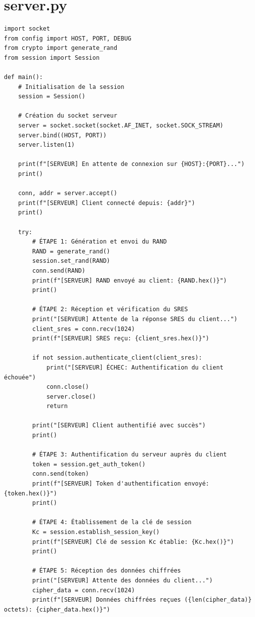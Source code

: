 \documentclass[12pt,a4paper]{report}
\begin{document}
\section{server.py}
\begin{verbatim}
import socket
from config import HOST, PORT, DEBUG
from crypto import generate_rand
from session import Session

def main():
    # Initialisation de la session
    session = Session()
    
    # Création du socket serveur
    server = socket.socket(socket.AF_INET, socket.SOCK_STREAM)
    server.bind((HOST, PORT))
    server.listen(1)
    
    print(f"[SERVEUR] En attente de connexion sur {HOST}:{PORT}...")
    print()
    
    conn, addr = server.accept()
    print(f"[SERVEUR] Client connecté depuis: {addr}")
    print()
    
    try:
        # ÉTAPE 1: Génération et envoi du RAND
        RAND = generate_rand()
        session.set_rand(RAND)
        conn.send(RAND)
        print(f"[SERVEUR] RAND envoyé au client: {RAND.hex()}")
        print()
        
        # ÉTAPE 2: Réception et vérification du SRES
        print("[SERVEUR] Attente de la réponse SRES du client...")
        client_sres = conn.recv(1024)
        print(f"[SERVEUR] SRES reçu: {client_sres.hex()}")
        
        if not session.authenticate_client(client_sres):
            print("[SERVEUR] ÉCHEC: Authentification du client échouée")
            conn.close()
            server.close()
            return
        
        print("[SERVEUR] Client authentifié avec succès")
        print()
        
        # ÉTAPE 3: Authentification du serveur auprès du client
        token = session.get_auth_token()
        conn.send(token)
        print(f"[SERVEUR] Token d'authentification envoyé: {token.hex()}")
        print()
        
        # ÉTAPE 4: Établissement de la clé de session
        Kc = session.establish_session_key()
        print(f"[SERVEUR] Clé de session Kc établie: {Kc.hex()}")
        print()
        
        # ÉTAPE 5: Réception des données chiffrées
        print("[SERVEUR] Attente des données du client...")
        cipher_data = conn.recv(1024)
        print(f"[SERVEUR] Données chiffrées reçues ({len(cipher_data)} octets): {cipher_data.hex()}")
        

\end{verbatim}
\end{document}
